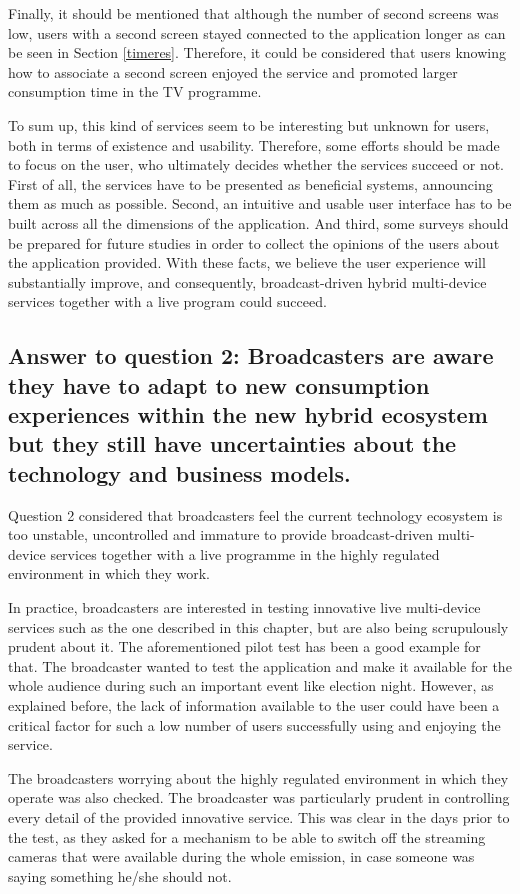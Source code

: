 Finally, it should be mentioned that although the number of second screens was low, users with a second screen stayed connected to the application longer as can be seen in Section \ref{timeres}. Therefore, it could be considered that users knowing how to associate a second screen enjoyed the service and promoted larger consumption time in the TV programme.

To sum up, this kind of services seem to be interesting but unknown for users, both in terms of existence and usability. Therefore, some efforts should be made to focus on the user, who ultimately decides whether the services succeed or not. First of all, the services have to be presented as beneficial systems, announcing them as much as possible. Second, an intuitive and usable user interface has to be built across all the dimensions of the application. And third, some surveys should be prepared for future studies in order to collect the opinions of the users about the application provided. With these facts, we believe the user experience will substantially improve, and consequently, broadcast-driven hybrid multi-device services together with a live program could succeed.

\subsection{Answer to question 2: Broadcasters are aware they have to adapt to new consumption experiences within the new hybrid ecosystem but they still have uncertainties about the technology and business models.} \label{broadcastDisc}
Question 2 considered that broadcasters feel the current technology ecosystem is too unstable, uncontrolled and immature to provide broadcast-driven multi-device services together with a live programme in the highly regulated environment in which they work.

In practice, broadcasters are interested in testing innovative live multi-device services such as the one described in this chapter, but are also being scrupulously prudent about it. The aforementioned pilot test has been a good example for that. The broadcaster wanted to test the application and make it available for the whole audience during such an important event like election night. However, as explained before, the lack of information available to the user could have been a critical factor for such a low number of users successfully using and enjoying the service. 

The broadcasters worrying about the highly regulated environment in which they operate was also checked. The broadcaster was particularly prudent in controlling every detail of the provided innovative service. This was clear in the days prior to the test, as they asked for a mechanism to be able to switch off the streaming cameras that were available during the whole emission, in case someone was saying something he/she should not.

